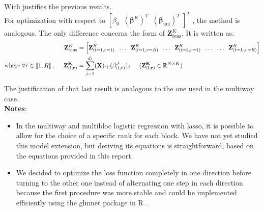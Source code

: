 \documentclass[10pt]{article}
\begin{document}
\noindent Wich justifies the previous results.\\[5 pt]
\noindent For optimization with respect to $\left[ \beta_0 \; \; \left(\bm{\beta}^K \right)^T \; \; \left( \bm{\beta}_{\text{uni}} \right)^T \; \right]^T$ , the method is analogous. The only difference concerns the form of $\mathbf{Z}_{\text{tens}}^K$. It is written as:
\begin{align}
    \mathbf{Z}_{\text{tens}}^K	&= \left[\mathbf{Z}_{(l= 1, r = 1)}^K \; \; \hdots \; \; \mathbf{Z}_{(l = 1, r = R)}^K  \; \; \hdots \; \; \mathbf{Z}_{(l = 2, r = 1)}^K \; \; \hdots  \; \;\hdots \; \; \mathbf{Z}_{(l = L, r = R)}^K \right] \label{eqref: Z^K}\\
    \text{where} \; \forall r \in \llbracket 1, R\rrbracket\, , \hspace{0.5 cm} \mathbf{Z_{(l,r)}^K} &= \sum\limits_{j = 1}^{d_l} (\mathbf{X})_{:j:} (\beta_{(l,r)}^J)_j \hspace{0.5 cm} (\mathbf{Z_{(l,r)}^K} \in \mathbb{R}^{N \times K}) \label{eqref: Z_tens^K}\\
\end{align}

\noindent The justification of that last result is analogous to the one used in the multiway case.\\[2 pt]

\noindent \textbf{Notes}: 
\begin{itemize}
\item In the multiway and multibloc logistic regression with lasso, it is possible to allow for the choice of a specific rank for each block. We have not yet studied this model extension, but deriving its equations is straightforward, based on the equations provided in this report.
\item We decided to optimize the loss function completely in one direction before turning to the other one instead of alternating one step in each direction because the first procedure was more stable and could be implemented efficiently using the glmnet package in R \cite{glmnet}. 
\end{itemize}

\vspace{7 pt}
\end{document}
